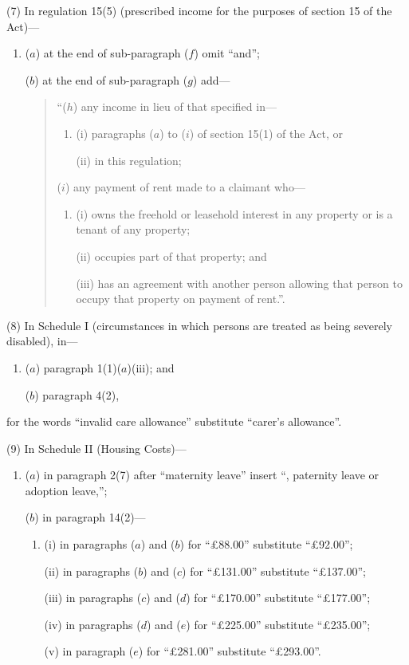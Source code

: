 \documentclass[12pt,a4paper]{article}
\begin{document}
(7) In regulation 15(5) (prescribed income for the purposes of section 15 of the Act)—
\begin{enumerate}\item[]
($a$) at the end of sub-paragraph ($f$)  omit “and”;

($b$) at the end of sub-paragraph ($g$)  add—
\begin{quotation}
“($h$) any income in lieu of that specified in—
\begin{enumerate}\item[]
(i) paragraphs ($a$)  to ($i$)  of section 15(1) of the Act, or

(ii) in this regulation;
\end{enumerate}

($i$) any payment of rent made to a claimant who—
\begin{enumerate}\item[]
(i) owns the freehold or leasehold interest in any property or is a tenant of any property;

(ii) occupies part of that property; and

(iii) has an agreement with another person allowing that person to occupy that property on payment of rent.”.
\end{enumerate}
\end{quotation}
\end{enumerate}

(8) In Schedule I (circumstances in which persons are treated as being severely disabled), in—
\begin{enumerate}\item[]
($a$) paragraph 1(1)($a$)(iii); and

($b$) paragraph 4(2),
\end{enumerate}
for the words “invalid care allowance” substitute “carer’s allowance”.

(9) In Schedule II (Housing Costs)—
\begin{enumerate}\item[]
($a$) in paragraph 2(7) after “maternity leave” insert “, paternity leave or adoption leave,”;

($b$) in paragraph 14(2)—
\begin{enumerate}\item[]
(i) in paragraphs ($a$)  and ($b$)  for “£88$.$00” substitute “£92$.$00”;

(ii) in paragraphs ($b$)  and ($c$)  for “£131$.$00” substitute “£137$.$00”;

(iii) in paragraphs ($c$)  and ($d$)  for “£170$.$00” substitute “£177$.$00”;

(iv) in paragraphs ($d$)  and ($e$)  for “£225$.$00” substitute “£235$.$00”;

(v) in paragraph ($e$)  for “£281$.$00” substitute “£293$.$00”.
\end{enumerate}
\end{enumerate}
\end{document}
